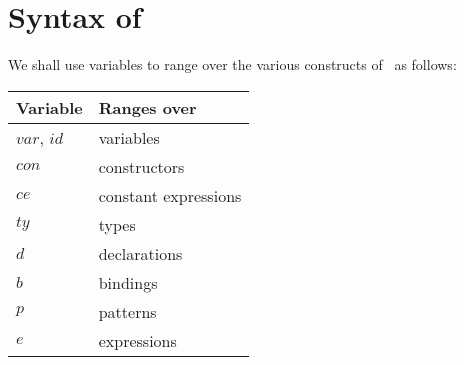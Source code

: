\documentclass[11pt]{article}
\begin{document}



\bigskip


\section{Syntax of \ML}
\label{sec:ML-syntax}

We shall use variables to range over the various constructs of \ML\ as
follows:

\begin{center}
\begin{tabular}{|l|l|}
  \hline
  Variable & Ranges over\\
  \hline
  $var$, $id$ & variables\\
  $con$       & constructors\\
  $ce$        & constant expressions\\
  $ty$        & types\\
  $d$         & declarations\\
  $b$         & bindings\\
  $p$         & patterns\\
  $e$         & expressions\\
  \hline
\end{tabular}
\end{center}
\end{document}
